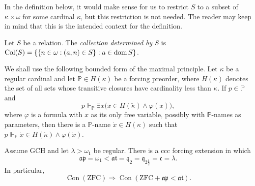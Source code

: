 In the definition below, it would make sense for us to restrict $S$ to a subset of $\kappa\times\omega$ for some cardinal $\kappa$, but this restriction is not needed.
The reader may keep in mind that this is the intended context for the definition.

\begin{definition}\label{def:Col}
  Let $S$ be a relation.
  The \emph{collection determined by $S$} is $\operatorname{Col}(S)=\{\{n\in\omega: (a,n)\in S\}: a \in \operatorname{dom} S\}$.
\end{definition}

We shall use the following bounded form of the maximal principle.  Let
$\kappa$ be a regular cardinal and let $\mathbb P\in H(\kappa)$ be a forcing
preorder, where $H(\kappa)$ denotes the set of all sets whose transitive closures
have cardinality less than $\kappa$.  If $p\in\mathbb P$ and
\[
  p\Vdash_{\mathbb P}\exists x\bigl(x\in H(\check\kappa)\wedge\varphi(x)\bigr),
\]
where $\varphi$ is a formula with $x$ as its only free variable, possibly with
$\mathbb P$-names as parameters, then there is a $\mathbb P$-name
$\dot x\in H(\kappa)$ such that $p\Vdash_{\mathbb P}\dot x\in H(\check\kappa)\wedge\varphi(\dot x)$.

\begin{thm}\label{thm:consistent-ap-below-at}
Assume GCH and let $\lambda>\omega_1$ be regular.  There is a ccc forcing
extension in which
\[
  \mathfrak{ap}=\omega_1<
  \mathfrak{at}=\mathfrak q_2=\mathfrak q_{2\frac{1}{2}}=\mathfrak c=\lambda.
\]
In particular,
\[
  \operatorname{Con}(\mathrm{ZFC})
  \Rightarrow
  \operatorname{Con}(\mathrm{ZFC}+\mathfrak{ap}<\mathfrak{at}).
\]
\end{thm}

